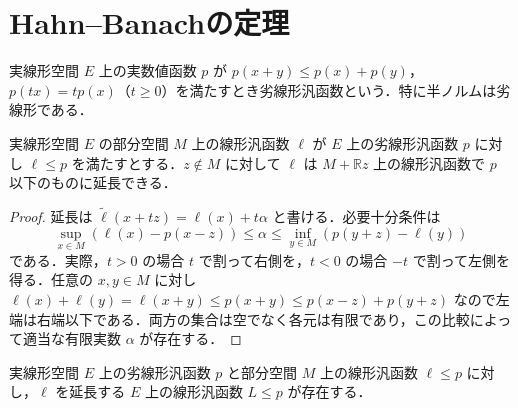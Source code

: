 \section{Hahn–Banachの定理}
\begin{defn}[劣線形汎函数]
実線形空間 $E$ 上の実数値函数 $p$ が $p(x+y)\leq p(x)+p(y)$，$p(tx)=tp(x)$（$t\geq0$）を満たすとき劣線形汎函数という．特に半ノルムは劣線形である．
\end{defn}
\begin{prop}[線形汎函数の一次元延長]
実線形空間 $E$ の部分空間 $M$ 上の線形汎函数 $\ell$ が $E$ 上の劣線形汎函数 $p$ に対し $\ell\leq p$ を満たすとする．$z\notin M$ に対して $\ell$ は $M+\mathbb Rz$ 上の線形汎函数で $p$ 以下のものに延長できる．
\end{prop}
\begin{proof}
延長は $\widetilde\ell(x+tz)=\ell(x)+t\alpha$ と書ける．必要十分条件は
\[
\sup_{x\in M}(\ell(x)-p(x-z))\leq\alpha\leq\inf_{y\in M}(p(y+z)-\ell(y))
\]
である．実際，$t>0$ の場合 $t$ で割って右側を，$t<0$ の場合 $-t$ で割って左側を得る．任意の $x,y\in M$ に対し $\ell(x)+\ell(y)=\ell(x+y)\leq p(x+y)\leq p(x-z)+p(y+z)$ なので左端は右端以下である．両方の集合は空でなく各元は有限であり，この比較によって適当な有限実数 $\alpha$ が存在する．
\end{proof}
\begin{prop}
実線形空間 $E$ 上の劣線形汎函数 $p$ と部分空間 $M$ 上の線形汎函数 $\ell\leq p$ に対し，$\ell$ を延長する $E$ 上の線形汎函数 $L\leq p$ が存在する．
\end{prop}
